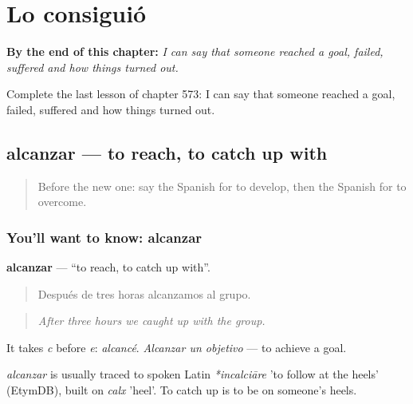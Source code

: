 
\chapter{Lo consiguió}
\label{ch:es-lo-consiguio}

\begin{chapteropening}
\textbf{By the end of this chapter:} \emph{I can say that someone reached a goal, failed, suffered and how things turned out.}

Complete the last lesson of chapter 573: I can say that someone reached a goal, failed, suffered and how things turned out.
\end{chapteropening}

\section[alcanzar]{alcanzar — to reach, to catch up with}

\label{lesson:ES-C573-alcanzar}



\begin{quote}
Before the new one: say the Spanish for to develop, then the Spanish for to overcome.
\end{quote}

\subsection*{You'll want to know: alcanzar}
\textbf{alcanzar} — \textquotedblleft{}to reach, to catch up with\textquotedblright{}.

\begin{quote}
Después de tres horas alcanzamos al grupo.
\end{quote}

\begin{quote}
\emph{After three hours we caught up with the group.}
\end{quote}

It takes \emph{c} before \emph{e}: \emph{alcancé}. \emph{Alcanzar un objetivo} — to achieve a goal.

\begin{cousinweb}
\emph{alcanzar} is usually traced to spoken Latin \emph{*incalciāre} 'to follow at the heels' (EtymDB), built on \emph{calx} 'heel'. To catch up is to be on someone's heels.
\end{cousinweb}

